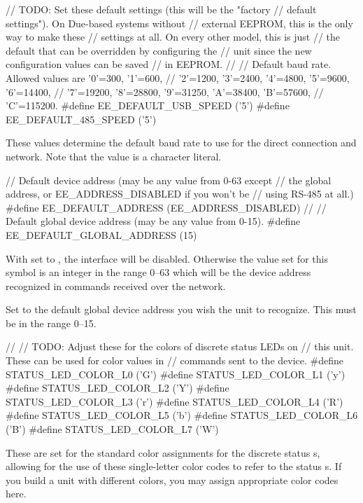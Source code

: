 \begin{SourceCode}
// TODO: Set these default settings (this will be the "factory
//	 default settings"). On Due-based systems without 
//	 external EEPROM, this is the only way to make these
//       settings at all. On every other model, this is just
//       the default that can be overridden by configuring the
//       unit since the new configuration values can be saved 
//       in EEPROM.
//
// Default baud rate. Allowed values are '0'=300, '1'=600, 
// '2'=1200, '3'=2400, '4'=4800, '5'=9600, '6'=14400,
// '7'=19200, '8'=28800, '9'=31250, 'A'=38400, 'B'=57600,
// 'C'=115200.
#define EE_DEFAULT_USB_SPEED  ('5')
#define EE_DEFAULT_485_SPEED ('5')
\end{SourceCode}
These values determine the default baud rate to use for the  direct
connection and  network. Note that the value is a character literal.

\begin{SourceCode}
// Default device address (may be any value from 0-63 except
// the global address, or EE_ADDRESS_DISABLED if you won't be 
// using RS-485 at all.)
#define EE_DEFAULT_ADDRESS (EE_ADDRESS_DISABLED)
//
// Default global device address (may be any value from 0-15).
#define EE_DEFAULT_GLOBAL_ADDRESS (15)
\end{SourceCode}
With  set to ,
the  interface will be disabled. Otherwise the value
set for this symbol is an integer in the range 0--63 which will be
the device address recognized in commands received over the
 network.

Set  to the default global device address you
wish the unit to recognize. This must be in the range 0--15.

\begin{SourceCode}
//
// TODO: Adjust these for the colors of discrete status LEDs on
//       this unit. These can be used for color values in
//       commands sent to the device.
#define STATUS_LED_COLOR_L0 ('G')
#define STATUS_LED_COLOR_L1 ('y')
#define STATUS_LED_COLOR_L2 ('Y')
#define STATUS_LED_COLOR_L3 ('r')
#define STATUS_LED_COLOR_L4 ('R')
#define STATUS_LED_COLOR_L5 ('b')
#define STATUS_LED_COLOR_L6 ('B')
#define STATUS_LED_COLOR_L7 ('W')
\end{SourceCode}
These are set for the standard color assignments for the discrete status s, allowing for
the use of these single-letter color codes to refer to the status s. If you build a
unit with different colors, you may assign appropriate color codes here.

